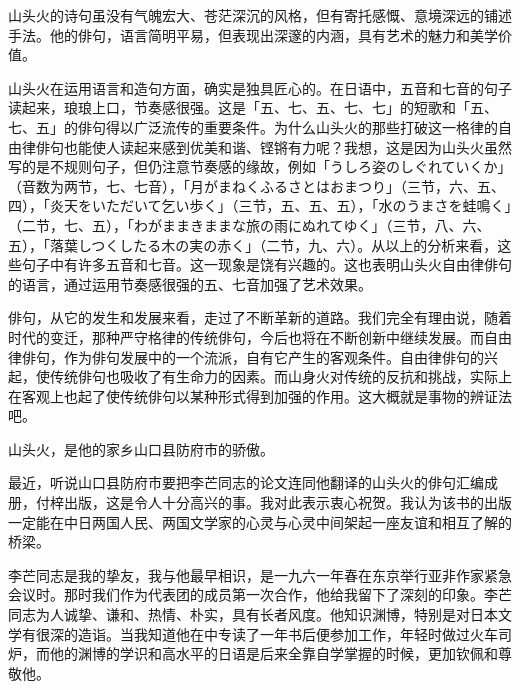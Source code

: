 {    

    山头火的诗句虽没有气魄宏大、苍茫深沉的风格，但有寄托感慨、意境深远的铺述手法。他的俳句，语言简明平易，但表现出深邃的内涵，具有艺术的魅力和美学价值。

    山头火在运用语言和造句方面，确实是独具匠心的。在日语中，五音和七音的句子读起来，琅琅上口，节奏感很强。这是「五、七、五、七、七」的短歌和「五、七、五」的俳句得以广泛流传的重要条件。为什么山头火的那些打破这一格律的自由律俳句也能使人读起来感到优美和谐、铿锵有力呢？我想，这是因为山头火虽然写的是不规则句子，但仍注意节奏感的缘故，例如「{\FM うしろ姿のしぐれていくか}」（音数为两节，七、七音），「{\FM 月がまねくふるさとはおまつり}」（三节，六、五、四），「{\FM 炎天をいただいて乞い歩く}」（三节，五、五、五），「{\FM 水のうまさを蛙鳴く}」（二节，七、五），「{\FM わがままきままな旅の雨にぬれてゆく}」（三节，八、六、五），「{\FM 落葉しつくしたる木の実の赤く}」（二节，九、六）。从以上的分析来看，这些句子中有许多五音和七音。这一现象是饶有兴趣的。这也表明山头火自由律俳句的语言，通过运用节奏感很强的五、七音加强了艺术效果。

    俳句，从它的发生和发展来看，走过了不断革新的道路。我们完全有理由说，随着时代的变迁，那种严守格律的传统俳句，今后也将在不断创新中继续发展。而自由律俳句，作为俳句发展中的一个流派，自有它产生的客观条件。自由律俳句的兴起，使传统俳句也吸收了有生命力的因素。而山身火对传统的反抗和挑战，实际上在客观上也起了使传统俳句以某种形式得到加强的作用。这大概就是事物的辨证法吧。

    山头火，是他的家乡山口县防府市的骄傲。

    最近，听说山口县防府市要把李芒同志的论文连同他翻译的山头火的俳句汇编成册，付梓出版，这是令人十分高兴的事。我对此表示衷心祝贺。我认为该书的出版一定能在中日两国人民、两国文学家的心灵与心灵中间架起一座友谊和相互了解的桥梁。

    李芒同志是我的挚友，我与他最早相识，是一九六一年春在东京举行亚非作家紧急会议时。那时我们作为代表团的成员第一次合作，他给我留下了深刻的印象。李芒同志为人诚挚、谦和、热情、朴实，具有长者风度。他知识渊博，特别是对日本文学有很深的造诣。当我知道他在中专读了一年书后便参加工作，年轻时做过火车司炉，而他的渊博的学识和高水平的日语是后来全靠自学掌握的时候，更加钦佩和尊敬他。

}
